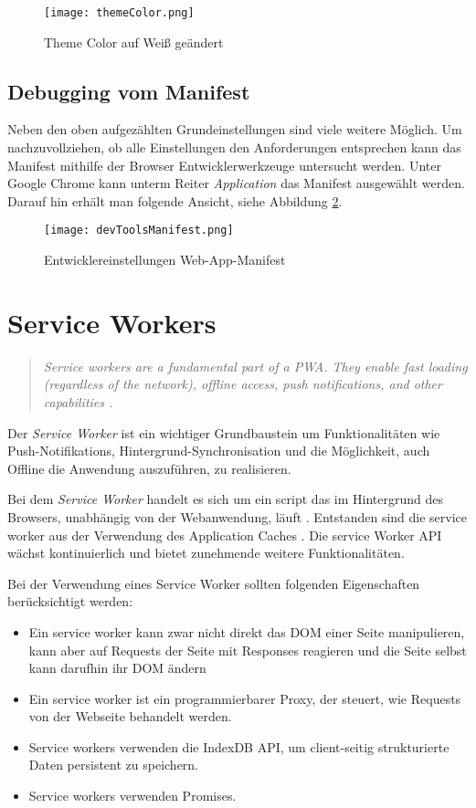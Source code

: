 \begin{figure}[!htb]
    \texttt{[image: themeColor.png]}
    \caption{Theme Color auf Weiß geändert}
    \label{img:themeColor}
\end{figure}

\subsection{Debugging vom Manifest}

Neben den oben aufgezählten Grundeinstellungen sind viele weitere Möglich. Um nachzuvollziehen, ob alle Einstellungen den Anforderungen entsprechen kann das Manifest mithilfe der Browser Entwicklerwerkzeuge untersucht werden. Unter Google Chrome kann unterm Reiter \textit{Application} das Manifest ausgewählt werden. Darauf hin erhält man folgende Ansicht, siehe Abbildung \ref{img:devManifest}.

\begin{figure}[!htb]
    \centering
    \texttt{[image: devToolsManifest.png]}
    \caption{Entwicklereinstellungen Web-App-Manifest}
    \label{img:devManifest}
\end{figure}


\newpage

\section{Service Workers}\label{sec:ServiceWorker}
\begin{quote}
    \textit{Service workers are a fundamental part of a PWA. They enable fast loading (regardless of the network), offline access, push notifications, and other capabilities \cite{Developers2022a}.}
\end{quote}

Der \textit{Service Worker} ist ein wichtiger Grundbaustein um Funktionalitäten wie Push-Notifikations, Hintergrund-Synchronisation und die Möglichkeit, auch Offline die Anwendung auszuführen, zu realisieren. 

Bei dem \textit{Service Worker} handelt es sich um ein script das im Hintergrund des Browsers, unabhängig von der Webanwendung, läuft \cite{Gaunt2021}. Entstanden sind die service worker aus der Verwendung des Application Caches . Die service Worker \ac{API} wächst kontinuierlich und bietet zunehmende weitere Funktionalitäten.

Bei der Verwendung eines Service Worker sollten folgenden Eigenschaften berücksichtigt werden: 
\begin{itemize}
    \item Ein service worker kann zwar nicht direkt das \ac{DOM} einer Seite manipulieren, kann aber auf Requests der Seite mit Responses reagieren und die Seite selbst kann darufhin ihr DOM ändern
    \item Ein service worker ist ein \glqq programmierbarer\grqq{} Proxy, der steuert, wie Requests von der Webseite behandelt werden.
    \item Service workers verwenden die IndexDB API, um client-seitig strukturierte Daten persistent zu speichern.
    \item Service workers verwenden Promises. 
\end{itemize}


